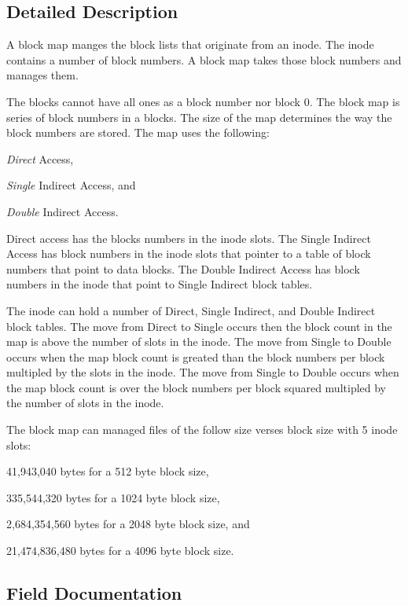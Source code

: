 \subsection{Detailed Description}
A block map manges the block lists that originate from an inode. The inode contains a number of block numbers. A block map takes those block numbers and manages them.

The blocks cannot have all ones as a block number nor block 0. The block map is series of block numbers in a blocks. The size of the map determines the way the block numbers are stored. The map uses the following\+:

\begin{DoxyItemize}
\item {\itshape Direct} Access, \item {\itshape Single} Indirect Access, and \item {\itshape Double} Indirect Access.\end{DoxyItemize}
Direct access has the blocks numbers in the inode slots. The Single Indirect Access has block numbers in the inode slots that pointer to a table of block numbers that point to data blocks. The Double Indirect Access has block numbers in the inode that point to Single Indirect block tables.

The inode can hold a number of Direct, Single Indirect, and Double Indirect block tables. The move from Direct to Single occurs then the block count in the map is above the number of slots in the inode. The move from Single to Double occurs when the map block count is greated than the block numbers per block multipled by the slots in the inode. The move from Single to Double occurs when the map block count is over the block numbers per block squared multipled by the number of slots in the inode.

The block map can managed files of the follow size verses block size with 5 inode slots\+:

\begin{DoxyItemize}
\item 41,943,040 bytes for a 512 byte block size, \item 335,544,320 bytes for a 1024 byte block size, \item 2,684,354,560 bytes for a 2048 byte block size, and \item 21,474,836,480 bytes for a 4096 byte block size. \end{DoxyItemize}


\subsection{Field Documentation}
\mbox{\label{structrtems__rfs__block__map__s_a8358418370ab17c66051ee0d3f2abce2}} 
